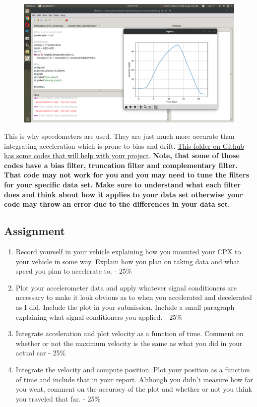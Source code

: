 \begin{figure}[H]
  \begin{center}
    \includegraphics[width=\textwidth]{Figures/accelerometer_integration.png}
  \end{center}
\end{figure}
This is why speedometers are used. They are just much more accurate than integrating acceleration which is prone to bias and drift. \href{https://github.com/cmontalvo251/Python/tree/master/instrumentation/cpx_assignments/Velocity_from_Acceleration}{This folder on Github has some codes that will help with your project}. {\bf Note, that some of those codes have a bias filter, truncation filter and complementary filter. That code may not work for you and you may need to tune the filters for your specific data set. Make sure to understand what each filter does and think about how it applies to your data set otherwise your code may throw an error due to the differences in your data set.}

\subsection{Assignment}



\begin{enumerate}[itemsep=-5pt]
\item Record yourself in your vehicle explaining how you mounted your CPX to your vehicle in some way. Explain how you plan on taking data and what speed you plan to accelerate to. - 25\%
\item Plot your accelerometer data and apply whatever signal conditioners are necessary to make it look obvious as to when you accelerated and decelerated as I did. Include the plot in your submission. Include a small paragraph explaining what signal conditioners you applied. - 25\%
\item Integrate acceleration and plot velocity as a function of time. Comment on whether or not the maximum velocity is the same as what you did in your actual car - 25\%
\item Integrate the velocity and compute position. Plot your position as a function of time and include that in your report. Although you didn't measure how far you went, comment on the accuracy of the plot and whether or not you think you traveled that far. - 25\%
\end{enumerate}
